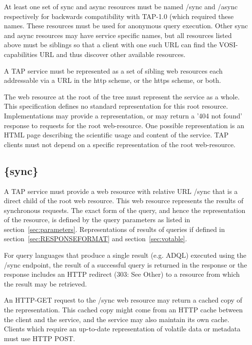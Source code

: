 \documentclass[11pt,letter]{ivoa}
\begin{document}
At least one set of {sync} and {async} resources must be named /sync and 
/async respectively for backwards compatibility with TAP-1.0 (which required 
these names. These resources must be used for anonymous query execution. Other 
{sync} and {async} resources may have service specific names, but all resources 
listed above must be siblings so that a client with one such URL can find the 
VOSI-capabilities URL and thus discover other available resources. 

A TAP service must be represented as a set of sibling web resources each 
addressable via a URL in the http scheme, or the https scheme, or both.

The web resource at the root of the tree must represent the service as a whole. 
This specification defines no standard representation for this root resource. 
Implementations may provide a representation, or may return a '404 not found' 
response to requests for the root web-resource. One possible representation is 
an HTML page describing the scientific usage and content of the service. TAP 
clients must not depend on a specific representation of the root web-resource.

\subsection{\{sync\}}
\label{sec:tap-sync}

A TAP service must provide a web resource with relative URL /sync that is a 
direct child of the root web resource. This web resource represents the results 
of synchronous requests. The exact form of the query, and hence the 
representation of the resource, is defined by the  query parameters as listed in 
section~\ref{sec:parameters}. Representations of results of queries if defined in 
section~\ref{sec:RESPONSEFORMAT} and section~\ref{sec:votable}.

For query languages that produce a single result (e.g. ADQL) executed using the 
/sync endpoint, the result of a successful query is returned in the response or 
the response includes an HTTP redirect (303: See Other) to a resource from 
which the result may be retrieved.

An HTTP-GET request to the /sync web resource may return a cached copy of the 
representation. This cached copy might come from an HTTP cache between the 
client and the service, and the service may also maintain its own cache. Clients 
which require an up-to-date representation of volatile data or metadata must use 
HTTP POST.
\end{document}
